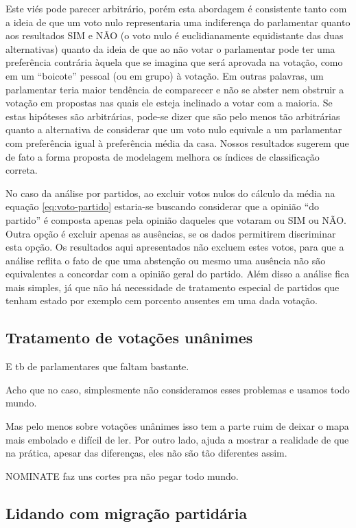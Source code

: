 \documentclass[a4paper, 12pt]{article}
\newcommand\nominate{NOMINATE\xspace}
\begin{document}
Este viés pode parecer arbitrário, porém esta abordagem é consistente tanto com a ideia de que um voto nulo representaria uma indiferença do parlamentar quanto aos resultados SIM e NÃO (o voto nulo é euclidianamente equidistante das duas alternativas) quanto da ideia de que ao não votar o parlamentar pode ter uma preferência contrária àquela que se imagina que será aprovada na votação, como em um ``boicote'' pessoal (ou em grupo) à votação. Em outras palavras, um parlamentar teria maior tendência de comparecer e não se abster nem obstruir a votação em propostas nas quais ele esteja inclinado a votar com a maioria. Se estas hipóteses são arbitrárias, pode-se dizer que são pelo menos tão arbitrárias quanto a alternativa de considerar que um voto nulo equivale a um parlamentar com preferência igual à preferência média da casa. Nossos resultados sugerem que de fato a forma proposta de modelagem melhora os índices de classificação correta.

No caso da análise por partidos, ao excluir votos nulos do cálculo da média na equação \ref{eq:voto-partido} estaria-se buscando considerar que a opinião ``do partido'' é composta apenas pela opinião daqueles que votaram ou SIM ou NÃO. Outra opção é excluir apenas as ausências, se os dados permitirem discriminar esta opção. Os resultados aqui apresentados não excluem estes votos, para que a análise reflita o fato de que uma abstenção ou mesmo uma ausência não são equivalentes a concordar com a opinião geral do partido. Além disso a análise fica mais simples, já que não há necessidade de tratamento especial de partidos que tenham estado por exemplo cem porcento ausentes em uma dada votação.



\subsection*{Tratamento de votações unânimes}

E tb de parlamentares que faltam bastante.

Acho que no caso, simplesmente não consideramos esses problemas e usamos todo mundo.

Mas pelo menos sobre votações unânimes isso tem a parte ruim de deixar o mapa mais embolado e difícil de ler. Por outro lado, ajuda a mostrar a realidade de que na prática, apesar das diferenças, eles não são tão diferentes assim.

\nominate faz uns cortes pra não pegar todo mundo.

\subsection*{Lidando com migração partidária}
\end{document}
